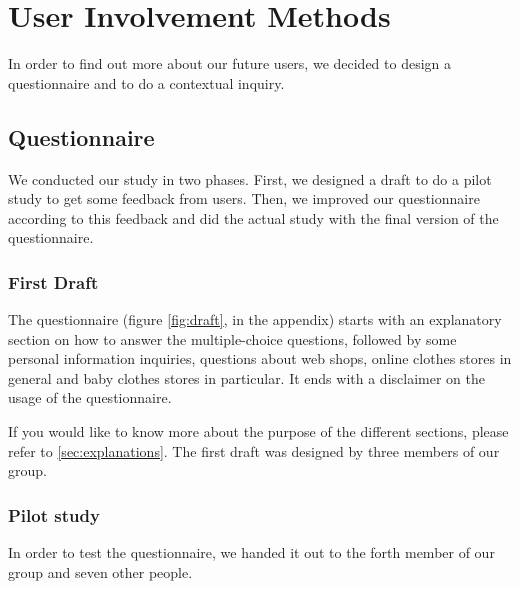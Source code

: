\section{User Involvement Methods}
In order to find out more about our future users, we decided to design a questionnaire and to do a contextual inquiry. 

\subsection{Questionnaire}

We conducted our study in two phases. First, we designed a draft to do a pilot study to get some feedback from users. Then, we improved our questionnaire according to this feedback and did the actual study with the final version of the questionnaire.

\subsubsection{First Draft}
The questionnaire (figure \ref{fig:draft}, in the appendix) starts with an explanatory section on how to answer the multiple-choice questions, followed by some personal information inquiries, questions about web shops, online clothes stores in general and baby clothes stores in particular. It ends with a disclaimer on the usage of the questionnaire.

If you would like to know more about the purpose of the different sections, please refer to \ref{sec:explanations}.
The first draft was designed by three members of our group.

\subsubsection{Pilot study}
In order to test the questionnaire, we handed it out to the forth member of our group 
and seven other people.

